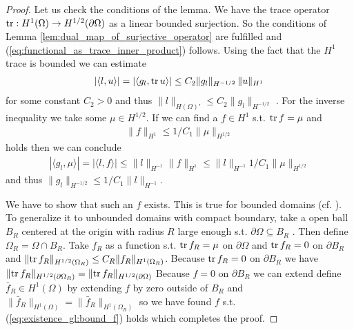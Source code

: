 \documentclass[../main.tex]{subfiles}
\begin{document}
\begin{proof}
    Let us check the conditions of the lemma. We have the trace operator 
    $\operatorname{tr}: H^1(\Omega) \rightarrow H^{1/2}(\partial \Omega)$ as a 
    linear bounded surjection. So the conditions of 
    Lemma \ref{lem:dual_map_of_surjective_operator} are fulfilled 
    and (\ref{eq:functional_as_trace_inner_product}) follows.
    Using the fact that the $H^1$ trace is bounded we can estimate 
    \begin{align*}
        |\langle l, u \rangle| = |\langle g_l, \operatorname{tr} u \rangle|
        \leq C_2 \lVert g_l \rVert _{H^{-1/2}} \, \lVert u \rVert _{H^1} 
    \end{align*}
    for some constant $C_2>0$
    and thus $\lVert l \rVert _{H(\Omega)'} \leq C_2 \lVert g_l \rVert _{H^{-1/2}}$ . 
    For the inverse inequality
    we take some $\mu \in H^{1/2}$. If we can find a $f \in H^1$ s.t. $\operatorname{tr} f = \mu$ and 
    \begin{align}
        \lVert f \rVert _{H^1} \leq 1/C_1 \lVert \mu \rVert _{H^{1/2}}\label{eq:existence_gl:bound_f}
    \end{align}
    holds then we can conclude
    \begin{align*}
        |\langle g_l, \mu \rangle| = |\langle l, f \rangle|
        \leq \lVert l \rVert _{H^{-1}} \lVert f \rVert _{H^1}
        \leq \lVert l \rVert _{H^{-1}} 1/C_1 \lVert \mu \rVert _{H^{1/2}}
    \end{align*}
    and thus $\lVert g_l \rVert _{H^{-1/2}} \leq 1/C_1 \lVert l \rVert _{H^{-1}}$.

    We have to show that such an $f$ exists. This is true for bounded domains (cf. \cite[Thm.\,3.10]{ern_guermond}).
    To generalize it to unbounded domains with compact boundary, take a open ball $B_R$ centered at the 
    origin with radius $R$ large enough s.t. $\partial \Omega \subseteq B_R$ . 
    Then define 
    $\Omega_R = \Omega \cap B_R$.
    Take $f_R$ as a function s.t. $\operatorname{tr} f_R = \mu$ on $\partial \Omega$ and 
    $\operatorname{tr} f_R = 0$ on $\partial B_R$ and $\lVert \operatorname{tr} f_R \rVert _{H^{1/2}(\Omega_R)}
    \leq C_R \lVert f_R \rVert _{H^1(\Omega_R)}$. Because $\operatorname{tr} f_R = 0$ on $\partial B_R$ 
    we have $\lVert \operatorname{tr} f_R \rVert _{H^{1/2}(\partial \Omega_R)} 
    = \lVert \operatorname{tr} f_R \rVert _{H^{1/2}(\partial \Omega)}$
    Because 
    $f= 0$ on $\partial B_R$ we can extend define $\bar{f}_R \in H^1(\Omega)$ by 
    extending $f$ by zero outside of $B_R$ and 
    $\lVert \bar{f}_R \rVert _{H^1(\Omega)} = \lVert \bar{f}_R \rVert _{H^1(\Omega_R)}$
    so we have found $f$ s.t. (\ref{eq:existence_gl:bound_f}) holds which completes the proof.
\end{proof}
\end{document}
